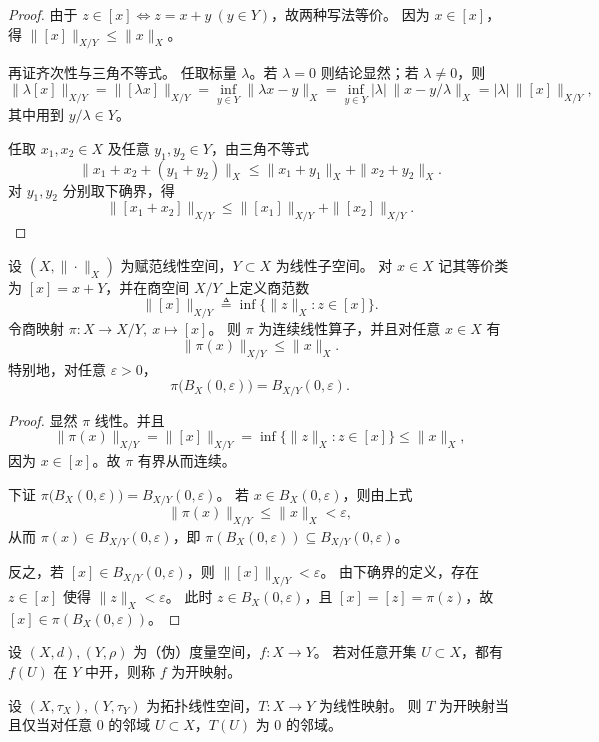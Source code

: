 \documentclass[lang=cn,a4paper,newtx,section]{elegantbook}
\begin{document}
\begin{proof}
  由于 $z\in[x]\iff z=x+y\ (y\in Y)$，故两种写法等价。
  因为 $x\in[x]$，得 $\|[x]\|_{X/Y}\le \|x\|_X$。

  再证齐次性与三角不等式。
  任取标量 $\lambda$。若 $\lambda=0$ 则结论显然；若 $\lambda\ne0$，则
  \[
    \|\lambda[x]\|_{X/Y}
    =\|[\lambda x]\|_{X/Y}
    =\inf_{y\in Y}\|\lambda x-y\|_X
    =\inf_{y\in Y}|\lambda|\,\|x-y/\lambda\|_X
    =|\lambda|\,\|[x]\|_{X/Y},
  \]
  其中用到 $y/\lambda\in Y$。

  任取 $x_1,x_2\in X$ 及任意 $y_1,y_2\in Y$，由三角不等式
  \[
    \|x_1+x_2+(y_1+y_2)\|_X\le \|x_1+y_1\|_X+\|x_2+y_2\|_X.
  \]
  对 $y_1,y_2$ 分别取下确界，得
  \[
    \|[x_1+x_2]\|_{X/Y}\le \|[x_1]\|_{X/Y}+\|[x_2]\|_{X/Y}.
  \]
\end{proof}
\begin{proposition}
  设 $(X,\|\cdot\|_X)$ 为赋范线性空间，$Y\subset X$ 为线性子空间。
  对 $x\in X$ 记其等价类为 $[x]=x+Y$，并在商空间 $X/Y$ 上定义商范数
  \[
    \|[x]\|_{X/Y}\triangleq \inf\{\|z\|_X: z\in[x]\}.
  \]
  令商映射 $\pi:X\to X/Y,\ x\mapsto[x]$。
  则 $\pi$ 为连续线性算子，并且对任意 $x\in X$ 有
  \[
    \|\pi(x)\|_{X/Y}\le \|x\|_X.
  \]
  特别地，对任意 $\varepsilon>0$，
  \[
    \pi\bigl(B_X(0,\varepsilon)\bigr)=B_{X/Y}(0,\varepsilon).
  \]
\end{proposition}

\begin{proof}
  显然 $\pi$ 线性。并且
  \[
    \|\pi(x)\|_{X/Y}=\|[x]\|_{X/Y}=\inf\{\|z\|_X:z\in[x]\}\le \|x\|_X,
  \]
  因为 $x\in[x]$。故 $\pi$ 有界从而连续。

  下证 $\pi\bigl(B_X(0,\varepsilon)\bigr)=B_{X/Y}(0,\varepsilon)$。
  若 $x\in B_X(0,\varepsilon)$，则由上式
  \[
    \|\pi(x)\|_{X/Y}\le\|x\|_X<\varepsilon,
  \]
  从而 $\pi(x)\in B_{X/Y}(0,\varepsilon)$，即 $\pi(B_X(0,\varepsilon))\subseteq B_{X/Y}(0,\varepsilon)$。

  反之，若 $[x]\in B_{X/Y}(0,\varepsilon)$，则 $\|[x]\|_{X/Y}<\varepsilon$。
  由下确界的定义，存在 $z\in[x]$ 使得 $\|z\|_X<\varepsilon$。
  此时 $z\in B_X(0,\varepsilon)$，且 $[x]=[z]=\pi(z)$，故 $[x]\in\pi(B_X(0,\varepsilon))$。
\end{proof}

\begin{definition}
  设 $(X,d),(Y,\rho)$ 为（伪）度量空间，$f:X\to Y$。
  若对任意开集 $U\subset X$，都有 $f(U)$ 在 $Y$ 中开，则称 $f$ 为开映射。
\end{definition}

\begin{proposition}\label{prop:open-map-linear}
  设 $(X,\tau_X),(Y,\tau_Y)$ 为拓扑线性空间，$T:X\to Y$ 为线性映射。
  则 $T$ 为开映射当且仅当对任意 $0$ 的邻域 $U\subset X$，$T(U)$ 为 $0$ 的邻域。
\end{proposition}
\end{document}

